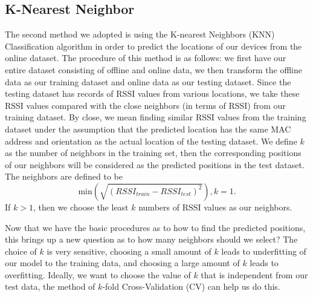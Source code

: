 \documentclass[12pt, conference]{IEEEtran}
\begin{document}
\subsection{K-Nearest Neighbor}
The second method we adopted is using the K-nearest Neighbors (KNN) Classification algorithm in order to predict the locations of our devices from the online dataset. The procedure of this method is as follows: we first have our entire dataset consisting of offline and online data, we then transform the offline data as our training dataset and online data as our testing dataset. Since the testing dataset has records of RSSI values from various locations, we take these RSSI values compared with the close neighbors (in terms of RSSI) from our training dataset. By close, we mean finding similar RSSI values from the training dataset under the assumption that the predicted location has the same MAC address and orientation as the actual location of the testing dataset. We define $k$ as the number of neighbors in the training set, then the corresponding positions of our neighbors will be considered as the predicted positions in the test dataset. The neighbors are defined to be 
$$
  \text{min}\left(\sqrt{(RSSI_{train}-RSSI_{test})^2}\right), k=1.
$$ 
If $k>1$, then we choose the least $k$ numbers of RSSI values as our neighbors.


Now that we have the basic procedures as to how to find the predicted positions, this brings up a new question as to how many neighbors should we select? The choice of $k$ is very sensitive, choosing a small amount of $k$ leads to underfitting of our model to the training data, and choosing a large amount of $k$ leads to overfitting. Ideally, we want to choose the value of $k$ that is independent from our test data, the method of $k$-fold Cross-Validation (CV) can help us do this.
\end{document}
